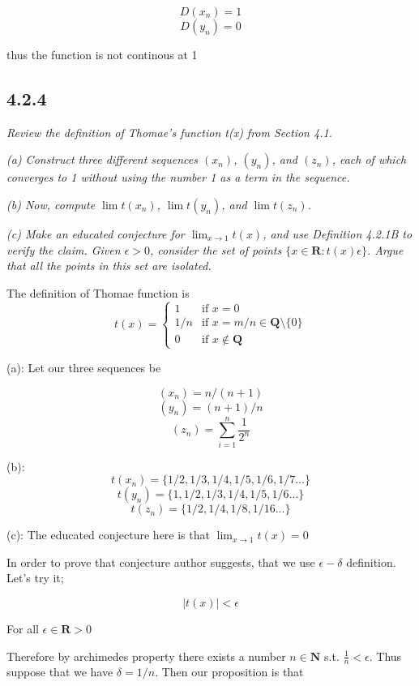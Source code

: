 \documentclass[11pt,oneside,titlepage]{book}
\begin{document}
$$ D(x_n) = 1$$
$$ D(y_n) = 0$$

thus the function is not continous at 1

\subsection*{4.2.4}
\textit{Review the definition of Thomae’s function t(x) from Section 4.1.}

\textit{(a) Construct three different sequences $(x_n)$, $(y_n)$, and $(z_n)$,
  each of which converges to 1 without using the number 1 as a term in the sequence.}

\textit{(b) Now, compute $\lim t(x_n)$, $\lim t(y_n)$, and $\lim t(z_n)$.}

\textit{(c) Make an educated conjecture for $\lim_{x\to1} t(x)$, and use Definition 4.2.1B
  to verify the claim. Given $\epsilon > 0$, consider the set of points
$\{x \in \textbf{R} : t(x)  \epsilon\}$.  Argue that all the points in this set are isolated.}


The definition of  Thomae function is
\begin{equation}
t(x)=
    \begin{cases}
      1 & \text{if } x = 0\\
      1/n & \text {if } x = m/n \in \textbf{Q} \text{\textbackslash} \{0\} \\
      0 & \text{if } x \notin \textbf{Q}
    \end{cases}
\end{equation}

(a): Let our three sequences be

$$ (x_n) = n/(n + 1)$$
$$ (y_n) = (n + 1)/n$$
$$ (z_n) = \sum_{i=1}^{n}{\frac{1}{2^n}}$$

(b):
$$t(x_n) = \{1/2, 1/3, 1/4, 1/5, 1/6, 1/7 ...\}$$
$$t(y_n) = \{1, 1/2, 1/3, 1/4, 1/5, 1/6 ...\}$$
$$t(z_n) = \{1/2, 1/4, 1/8, 1/16 ...\}$$

(c): The educated conjecture here is that $\lim_{x \to 1} t(x) = 0$

In order to prove that conjecture author suggests, that we use $\epsilon-\delta$ definition. Let's try
it;

$$ |t(x)| < \epsilon$$

For all $\epsilon \in \textbf{R} > 0$

Therefore by archimedes property there exists a number $n \in \textbf{N}$ s.t. $\frac{1}{n} < \epsilon$.
Thus suppose that we have $\delta = 1/n$. Then our proposition is that 
\end{document}
